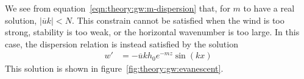 We see from equation~\ref{eqn:theory:gw:m-dispersion} that, for $m$ to have a real solution, $|\overline{u}k| < N$.  This constrain cannot be satisfied when the wind is too strong, stability is too weak, or the horizontal wavenumber is too large.  In this case, the dispersion relation is instead satisfied by the solution \textcite{lynch-cassano2006}
\begin{align}
	w' &= - \overline{u} k h_0 e^{-mz} \sin \left( kx \right)
\end{align}
This solution is shown in figure~\ref{fig:theory:gw:evanescent}.

\begin{figure}
	\centering
	\captionsetup[subfigure]{position=b}
	\centering
	 \\
%
	\caption{}
	\label{fig:theory:gw:stationary-waves}
\end{figure}



